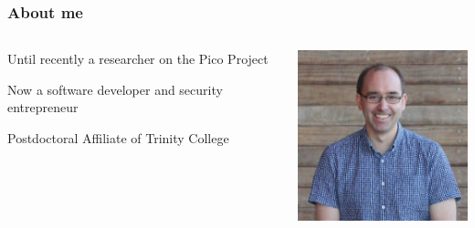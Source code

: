 \documentclass[handout, notes=hide]{beamer}
\begin{document}
\begin{frame}
\frametitle{About me}
\setlength{\parskip}{0.5em}

\begin{columns}[T]
\begin{column}[T]{0.6\textwidth}
\setlength{\parskip}{0.7em}
Until recently a researcher on the Pico Project

Now a software developer and security entrepreneur

Postdoctoral Affiliate of Trinity College

\end{column}
\begin{column}[T]{0.3\textwidth}
\vspace{0.0em}
\includegraphics[width=1.0\textwidth]{dlj}
\end{column}
\end{columns}


\end{frame}
\note{
\setlength{\parskip}{0.5em}
}
 
\end{document}

